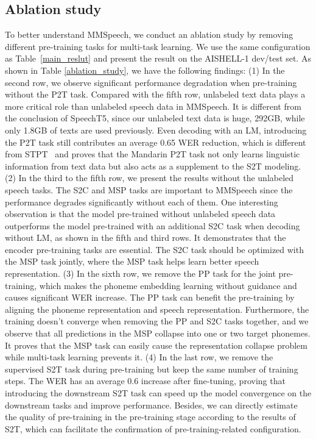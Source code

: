 \documentclass{article}
\begin{document}
\subsection{Ablation study}
\label{sec:ab}
To better understand MMSpeech, we conduct an ablation study by removing different pre-training tasks for multi-task learning. We use the same configuration as Table~\ref{main_reslut} and present the result on the AISHELL-1 dev/test set. As shown in Table \ref{ablation_study}, we have the following findings: (1) In the second row, we observe significant performance degradation when pre-training without the P2T task. Compared with the fifth row, unlabeled text data plays a more critical role than unlabeled speech data in MMSpeech. It is different from the conclusion of SpeechT5\cite{ao2021speecht5}, since our unlabeled text data is huge, 292GB, while only 1.8GB of texts are used previously\cite{ao2021speecht5,tang2022unified}. Even decoding with an LM, introducing the P2T task still contributes an average 0.65 WER reduction, which is different from STPT~\cite{tang2022unified} and proves that the Mandarin P2T task not only learns linguistic information from text data but also acts as a supplement to the S2T modeling. (2) In the third to the fifth row, we present the results without the unlabeled speech tasks. The S2C and MSP tasks are important to MMSpeech since the performance degrades significantly without each of them. One interesting observation is that the model pre-trained without unlabeled speech data outperforms the model pre-trained with an additional S2C task when decoding without LM, as shown in the fifth and third rows. It demonstrates that the encoder pre-training tasks are essential. The S2C task should be optimized with the MSP task jointly, where the MSP task helps learn better speech representation. (3) In the sixth row, we remove the PP task for the joint pre-training, which makes the phoneme embedding learning without guidance and causes significant WER increase. The PP task can benefit the pre-training by aligning the phoneme representation and speech representation. Furthermore, the training doesn't converge when removing the PP and S2C tasks together, and we observe that all predictions in the MSP collapse into one or two target phonemes. It proves that the MSP task can easily cause the representation collapse problem while multi-task learning prevents it. (4) In the last row, we remove the supervised S2T task during pre-training but keep the same number of training steps. The WER has an average 0.6 increase after fine-tuning, proving that introducing the downstream S2T task can speed up the model convergence on the downstream tasks and improve performance. Besides, we can directly estimate the quality of pre-training in the pre-training stage according to the results of S2T, which can facilitate the confirmation of pre-training-related configuration.
\end{document}
